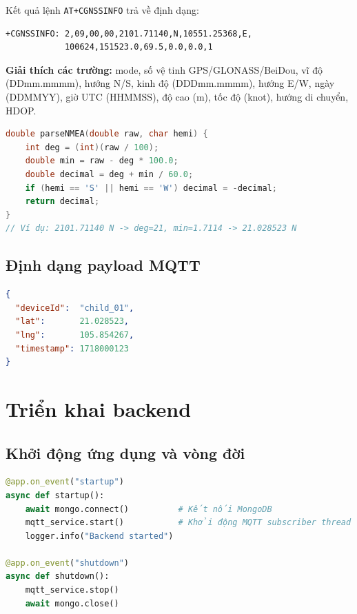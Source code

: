Kết quả lệnh \texttt{AT+CGNSSINFO} trả về định dạng:
\begin{lstlisting}[caption=Ví dụ phản hồi AT+CGNSSINFO]
+CGNSSINFO: 2,09,00,00,2101.71140,N,10551.25368,E,
            100624,151523.0,69.5,0.0,0.0,1
\end{lstlisting}

\textbf{Giải thích các trường:} mode, số vệ tinh GPS/GLONASS/BeiDou, vĩ độ (DDmm.mmmm), hướng N/S, kinh độ (DDDmm.mmmm), hướng E/W, ngày (DDMMYY), giờ UTC (HHMMSS), độ cao (m), tốc độ (knot), hướng di chuyển, HDOP.

\begin{lstlisting}[language=C++, caption=Hàm parse tọa độ NMEA sang decimal degrees]
double parseNMEA(double raw, char hemi) {
    int deg = (int)(raw / 100);
    double min = raw - deg * 100.0;
    double decimal = deg + min / 60.0;
    if (hemi == 'S' || hemi == 'W') decimal = -decimal;
    return decimal;
}
// Ví dụ: 2101.71140 N -> deg=21, min=1.7114 -> 21.028523 N
\end{lstlisting}

\subsection{Định dạng payload MQTT}

\begin{lstlisting}[language=json, caption=JSON payload gửi lên MQTT]
{
  "deviceId":  "child_01",
  "lat":       21.028523,
  "lng":       105.854267,
  "timestamp": 1718000123
}
\end{lstlisting}

\section{Triển khai backend}

\subsection{Khởi động ứng dụng và vòng đời}

\begin{lstlisting}[language=python, caption=backend/app/main.py -- startup/shutdown events]
@app.on_event("startup")
async def startup():
    await mongo.connect()          # Kết nối MongoDB
    mqtt_service.start()           # Khởi động MQTT subscriber thread
    logger.info("Backend started")

@app.on_event("shutdown")
async def shutdown():
    mqtt_service.stop()
    await mongo.close()
\end{lstlisting}

